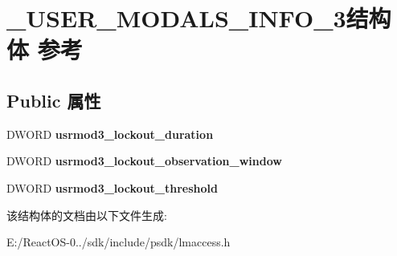 \hypertarget{struct___u_s_e_r___m_o_d_a_l_s___i_n_f_o__3}{}\section{\+\_\+\+U\+S\+E\+R\+\_\+\+M\+O\+D\+A\+L\+S\+\_\+\+I\+N\+F\+O\+\_\+3结构体 参考}
\label{struct___u_s_e_r___m_o_d_a_l_s___i_n_f_o__3}
\subsection*{Public 属性}
\begin{DoxyCompactItemize}
\item 
\mbox{\label{struct___u_s_e_r___m_o_d_a_l_s___i_n_f_o__3_a502567deee9a01508365a7820579f860}} 
D\+W\+O\+RD {\bfseries usrmod3\+\_\+lockout\+\_\+duration}
\item 
\mbox{\label{struct___u_s_e_r___m_o_d_a_l_s___i_n_f_o__3_a06717226f8b5df8aa0145708ec57ebce}} 
D\+W\+O\+RD {\bfseries usrmod3\+\_\+lockout\+\_\+observation\+\_\+window}
\item 
\mbox{\label{struct___u_s_e_r___m_o_d_a_l_s___i_n_f_o__3_a2458408874e15569f914acbda71670d2}} 
D\+W\+O\+RD {\bfseries usrmod3\+\_\+lockout\+\_\+threshold}
\end{DoxyCompactItemize}


该结构体的文档由以下文件生成\+:\begin{DoxyCompactItemize}
\item 
E\+:/\+React\+O\+S-\/0../sdk/include/psdk/lmaccess.\+h\end{DoxyCompactItemize}
